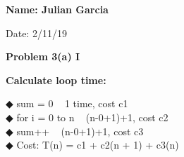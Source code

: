 \documentclass[12pt]{article}
\begin{document}
{\bf Name:
Julian Garcia
}
\par
Date:
2/11/19


\par
\bigskip
{\bf Problem
3(a) I
}
\par
\bigskip
{\bf Calculate loop time:}
\par

◆ sum = 0 ~ 1 time, cost c1 \\
◆ for i = 0 to n ~ (n-0+1)+1, cost c2 \\
◆ sum++ ~ (n-0+1)+1, cost c3 \\
◆ Cost: T(n) = c1 + c2(n + 1) + c3(n)

\par
\end{document}
